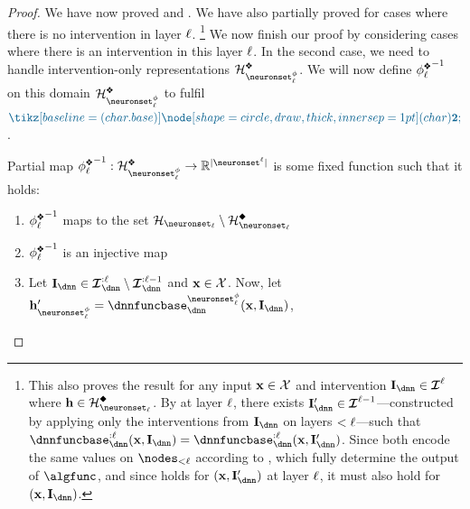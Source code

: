 \begin{proof}
    \newcommand{\goutput}{g^{\star}}

    We have now proved  and . 
    We have also partially proved  for cases where there is no intervention in layer $\ell$.
    \footnote{
    This also proves the result for any input $\mathbf{x} \in \mathcal{X}$ and intervention $\interventionsdnn \in \interventionsset^{\layer}$ where $\hiddenstates \in \AllInpIntActivationsLayerH{\layer}$. By  at layer $\ell$, there exists $\interventionsdnn' \in \interventionsset^{\layer-1}$—constructed by applying only the interventions from $\interventionsdnn$ on layers $<\ell$—such that $\dnnfunclayer{:\layer}(\bx, \interventionsdnn) = \dnnfunclayer{:\layer}(\bx, \interventionsdnn')$. Since both encode the same values on $\nodes_{<\layer}$ according to , which fully determine the output of $\algfunc$, and since  holds for $(\bx, \interventionsdnn')$ at layer $\ell$, it must also hold for $(\bx, \interventionsdnn)$.}
    We now finish our proof by considering cases where there is an intervention in this layer $\ell$. 
    In the second case, we need to handle intervention-only representations $\AllInpIntTransformedActivationsLayerTwoH{\layer}$.
    We will now define ${\causalmap_\layer^{\inter}}^{-1}$ on this domain $\AllInpIntTransformedActivationsLayerTwoH{\layer}$ to fulfil $\inductioncircle{2}$.
    \vspace{-8pt}
    \begin{definition}\label{Definition:phi_2}
        Partial map ${\causalmap_\layer^{\inter}}^{-1}: \AllInpIntTransformedActivationsLayerTwoH{\layer} \to \R^{|\neuronset^{\layer}|}$ is some fixed function such that it holds:
        \begin{enumerate}[topsep=0pt]
            \item ${\causalmap_\layer^{\inter}}^{-1}$ maps to the set $\AllActivationsLayerH{\layer}\setminus\AllInpIntActivationsLayerH{\layer}$ 
            \item ${\causalmap_\layer^{\inter}}^{-1}$ is an injective map
            \item Let $\interventionsdnn \in \interventionsset^{:\layer}_{\dnn}\setminus\interventionsset^{:\layer-1}_{\dnn}$ and $\mathbf{x} \in \mathcal{X}$.
            Now, let $\hiddenstates'_{\neuronset^{\causalmap}_{\layer}} = \dnnfunclayer{\neuronset^{\causalmap}_{\layer}}(\bx, \interventionsdnn)$, 

\end{enumerate}
\end{definition}
\end{proof}
